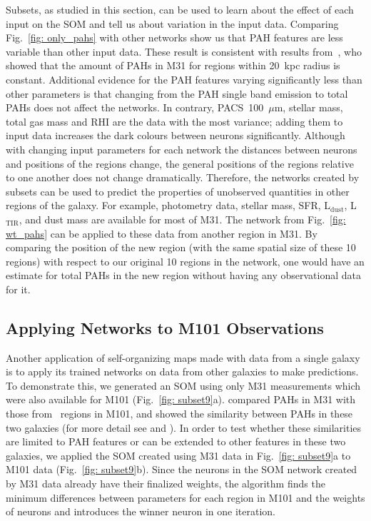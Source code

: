             Subsets, as studied in this section, can be used to learn about the effect of each input on the SOM and tell us about variation in the input data.
            Comparing Fig.~\ref{fig: only_pahs} with other networks show us that PAH features are less variable than other input data.
            These result is consistent with results from~\cite{Draine14}, who showed that the amount of PAHs in M31 for regions within 20~kpc radius is constant.
            Additional evidence for the PAH features varying significantly less than other parameters is that changing from the PAH single band emission to total PAHs does not affect the networks.
            In contrary, PACS~100~$\mu$m, stellar mass, total gas mass and RHI
            are the data with the most variance; adding them to input data increases the dark colours between neurons significantly.
            Although with changing input parameters for each network the distances between neurons and positions of the regions change, the general positions of the regions relative to one another does not change dramatically.
            Therefore, the networks created by subsets can be used to predict the properties of unobserved quantities in other regions of the galaxy.
            For example, photometry data, stellar mass, SFR, L$_\mathrm{dust}$, L$_\mathrm{TIR}$, and dust mass are available for most of M31. 
            The network from Fig.~\ref{fig: wt_pahs} can be applied to 
            these data from another region in M31.
            By comparing the position of the new region (with the same spatial size of these 10 regions) with respect to our original 10 regions in the network, one would have an estimate for total PAHs in the new region without having any observational data for it.


    \subsection{Applying Networks to M101 Observations}
    Another application of self-organizing maps made with data from a single galaxy is to apply its trained networks on data from other galaxies to make predictions.
    To demonstrate this, we generated an SOM using only M31 measurements which were also available for M101 (Fig.~\ref{fig: subset9}a). 
    \cite{Dim15} compared PAHs in M31 with those from \hii~regions in M101, and showed the similarity between PAHs in these two galaxies (for more detail see \cite{Dim15} and \cite{Gordon08}).
    In order to test whether these similarities are limited to PAH features or can be extended to other features in these two galaxies, we applied the SOM created using M31 data in Fig.~\ref{fig: subset9}a to M101 data (Fig.~\ref{fig: subset9}b).
    Since the neurons in the SOM network created by M31 data already have their finalized weights, the algorithm finds the minimum differences between parameters for each region in M101 and the weights of neurons and introduces the winner neuron in one iteration.
    
